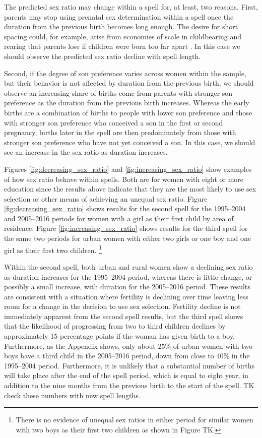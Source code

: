 \documentclass[12pt,letterpaper]{article}
\begin{document}
The predicted sex ratio may change within a spell for, at
least, two reasons.
First, parents may stop using prenatal sex determination within
a spell once the duration from the previous birth becomes long enough.
The desire for short spacing could, for example, arise from 
economies of scale in childbearing and rearing that parents lose 
if children were born too far apart \citep[p 374]{schultz97}. 
In this case we should observe the predicted sex ratio decline
with spell length.

Second, if the degree of son preference varies across women within 
the sample, but their behavior is not affected by duration from the 
previous birth, we should observe an increasing share of births come from 
parents with stronger son preference as the duration from the
previous birth increases.
Whereas the early births are a combination of births to
people with lower son preference and those with stronger son
preference who conceived a son in the first or second pregnancy,
births later in the spell are then predominately from those with stronger
son preference who have not yet conceived a son.
In this case, we should see an increase in the sex ratio 
as duration increases.


Figures \ref{fig:decreasing_sex_ratio} and \ref{fig:increasing_sex_ratio} show
examples of how sex ratio behave within spells.
Both are for women with eight or more education since the results above indicate
that they are the most likely to use sex selection or other means of achieving 
an unequal sex ratio.
Figure \ref{fig:decreasing_sex_ratio} shows results for the second spell for
the 1995--2004 and 2005--2016 periods for women with a girl as their first
child by area of residence.
Figure \ref{fig:increasing_sex_ratio} shows results for the third spell for
the same two periods for urban women with either two girls or one boy and one
girl as their first two children.%
\footnote{
There is no evidence of unequal sex ratios in either period for similar women 
with two boys as their first two children as shown in Figure TK.
}

Within the second spell, both urban and rural women show a declining
sex ratio as duration increases for the 1995--2004 period, whereas there
is little change, or possibly a small increase, with duration for the 
2005--2016 period.
These results are consistent with a situation where fertility is declining
over time leaving less room for a change in the decision to use sex selection.
Fertility decline is not immediately apparent from the second spell 
results, but the third spell shows that the likelihood of progressing from
two to third children declines by approximately 15 percentage points if
the woman has given birth to a boy.
Furthermore, as the Appendix shows, only about 25\% of urban women with 
two boys have a third child in the 2005--2016 period, 
down from close to 40\% in the 1995--2004 period. 
Furthermore, it is unlikely that a substantial number of births will take
place after the end of the spell period, which is equal to eight year, in
addition to the nine months from the previous birth to the start of the spell.
TK check these numbers with new spell lengths.
\end{document}

